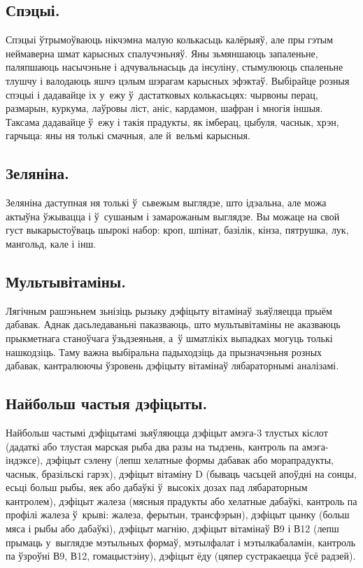 \subsection{Спэцыі.}
Спэцыі ўтрымоўваюць нікчэмна малую колькасьць калёрыяў, але пры гэтым неймаверна шмат карысных спалучэньняў. Яны зьмяншаюць запаленьне, паляпшаюць насычэньне і адчувальнасьць да інсуліну, стымулююць спаленьне тлушчу і валодаюць яшчэ цэлым шэрагам карысных эфэктаў. Выбірайце розныя спэцыі і дадавайце іх у~ежу ў~дастатковых колькасьцях: чырвоны перац, размарын, куркума, лаўровы ліст, аніс, кардамон, шафран і многія іншыя. Таксама дадавайце ў~ежу і такія прадукты, як імберац, цыбуля, часнык, хрэн, гарчыца: яны ня толькі смачныя, але й~вельмі карысныя.

\subsection{Зеляніна.}
Зеляніна даступная ня толькі ў~сьвежым выглядзе, што ідэальна, але можа актыўна ўжывацца і ў~сушаным і замарожаным выглядзе. Вы можаце на свой густ выкарыстоўваць шырокі набор: кроп, шпінат, базілік, кінза, пятрушка, лук, мангольд, кале і інш.

\subsection{Мультывітаміны.}
Лягічным рашэньнем зьнізіць рызыку дэфіцыту вітамінаў зьяўляецца прыём дабавак. Аднак дасьледаваньні паказваюць, што мультывітаміны не аказваюць прыкметнага станоўчага ўзьдзеяньня, а~ў шматлікіх выпадках могуць толькі нашкодзіць. Таму важна выбіральна падыходзіць да прызначэньня розных дабавак, кантралюючы ўзровень дэфіцыту вітамінаў лябараторнымі аналізамі.


\subsection{Найбольш частыя дэфіцыты.}
Найбольш частымі дэфіцытамі зьяўляюцца дэфіцыт амэга-3 тлустых кіслот (дадаткі або тлустая марская рыба два разы на тыдзень, кантроль па амэга-індэксе), дэфіцыт сэлену (лепш хелатные формы дабавак або морапрадукты, часнык, бразільскі гарэх), дэфіцыт вітаміну D (бываць часьцей апоўдні на сонцы, есьці больш рыбы, яек або дабаўкі ў~высокіх дозах пад лябараторным кантролем), дэфіцыт жалеза (мясныя прадукты або хелатные дабаўкі, кантроль па профілі жалеза ў~крыві: жалеза, ферытын, трансфэрын), дэфіцыт цынку (больш мяса і рыбы або дабаўкі), дэфіцыт магнію, дэфіцыт вітамінаў В9 і В12 (лепш прымаць у~выглядзе мэтыльных формаў, мэтылфалат і мэтылкабаламін, кантроль па ўзроўні В9, В12, гомацыстэіну), дэфіцыт ёду (цяпер сустракаецца ўсё радзей).

